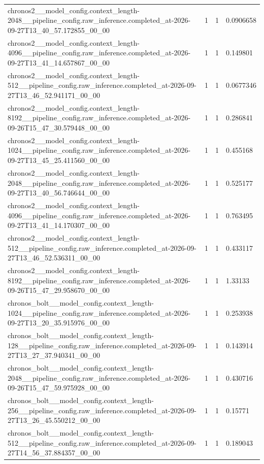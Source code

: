 \begin{tabular}{llll}
chronos2\_\_model\_config.context\_length-2048\_\_pipeline\_config.raw\_inference.completed\_at-2026-09-27T13\_40\_57.172855\_00\_00 & 1 & 1 & 0.0906658 \\
chronos2\_\_model\_config.context\_length-4096\_\_pipeline\_config.raw\_inference.completed\_at-2026-09-27T13\_41\_14.657867\_00\_00 & 1 & 1 & 0.149801 \\
chronos2\_\_model\_config.context\_length-512\_\_pipeline\_config.raw\_inference.completed\_at-2026-09-27T13\_46\_52.941171\_00\_00 & 1 & 1 & 0.0677346 \\
chronos2\_\_model\_config.context\_length-8192\_\_pipeline\_config.raw\_inference.completed\_at-2026-09-26T15\_47\_30.579448\_00\_00 & 1 & 1 & 0.286841 \\
chronos2\_\_model\_config.context\_length-1024\_\_pipeline\_config.raw\_inference.completed\_at-2026-09-27T13\_45\_25.411560\_00\_00 & 1 & 1 & 0.455168 \\
chronos2\_\_model\_config.context\_length-2048\_\_pipeline\_config.raw\_inference.completed\_at-2026-09-27T13\_40\_56.746644\_00\_00 & 1 & 1 & 0.525177 \\
chronos2\_\_model\_config.context\_length-4096\_\_pipeline\_config.raw\_inference.completed\_at-2026-09-27T13\_41\_14.170307\_00\_00 & 1 & 1 & 0.763495 \\
chronos2\_\_model\_config.context\_length-512\_\_pipeline\_config.raw\_inference.completed\_at-2026-09-27T13\_46\_52.536311\_00\_00 & 1 & 1 & 0.433117 \\
chronos2\_\_model\_config.context\_length-8192\_\_pipeline\_config.raw\_inference.completed\_at-2026-09-26T15\_47\_29.958670\_00\_00 & 1 & 1 & 1.33133 \\
chronos\_bolt\_\_model\_config.context\_length-1024\_\_pipeline\_config.raw\_inference.completed\_at-2026-09-27T13\_20\_35.915976\_00\_00 & 1 & 1 & 0.253938 \\
chronos\_bolt\_\_model\_config.context\_length-128\_\_pipeline\_config.raw\_inference.completed\_at-2026-09-27T13\_27\_37.940341\_00\_00 & 1 & 1 & 0.143914 \\
chronos\_bolt\_\_model\_config.context\_length-2048\_\_pipeline\_config.raw\_inference.completed\_at-2026-09-26T15\_47\_59.975928\_00\_00 & 1 & 1 & 0.430716 \\
chronos\_bolt\_\_model\_config.context\_length-256\_\_pipeline\_config.raw\_inference.completed\_at-2026-09-27T13\_26\_45.550212\_00\_00 & 1 & 1 & 0.15771 \\
chronos\_bolt\_\_model\_config.context\_length-512\_\_pipeline\_config.raw\_inference.completed\_at-2026-09-27T14\_56\_37.884357\_00\_00 & 1 & 1 & 0.189043 \\

\end{tabular}
